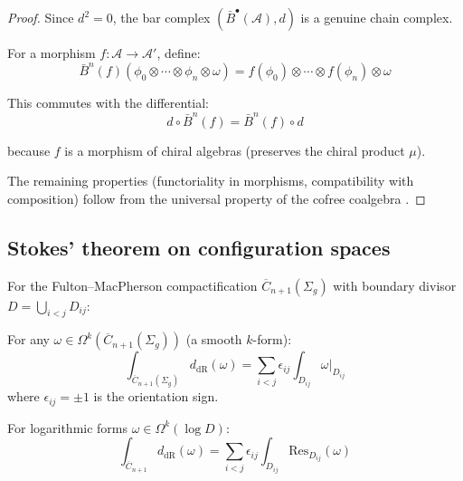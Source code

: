 \begin{proof}
Since $d^2 = 0$, the bar complex $(\bar{B}^{\bullet}(\mathcal{A}), d)$ is a genuine chain complex.

For a morphism $f: \mathcal{A} \to \mathcal{A}'$, define:
\[\bar{B}^n(f)(\phi_0 \otimes \cdots \otimes \phi_n \otimes \omega) = f(\phi_0) \otimes \cdots \otimes f(\phi_n) \otimes \omega\]

This commutes with the differential:
\[d \circ \bar{B}^n(f) = \bar{B}^n(f) \circ d\]

because $f$ is a morphism of chiral algebras (preserves the chiral product $\mu$).

The remaining properties (functoriality in morphisms, compatibility with composition) follow from the universal property of the cofree coalgebra \cite[Section~1.2]{LV12}.
\end{proof}

\subsection{Stokes' theorem on configuration spaces}

\begin{theorem}\label{thm:stokes-config}
For the Fulton--MacPherson compactification $\overline{C}_{n+1}(\Sigma_g)$ with boundary divisor $D = \bigcup_{i<j} D_{ij}$:

For any $\omega \in \Omega^k(\overline{C}_{n+1}(\Sigma_g))$ (a smooth $k$-form):
\[\int_{\overline{C}_{n+1}(\Sigma_g)} d_{\text{dR}}(\omega) = \sum_{i<j} \epsilon_{ij} \int_{D_{ij}} \omega|_{D_{ij}}\]
where $\epsilon_{ij} = \pm 1$ is the orientation sign.

For logarithmic forms $\omega \in \Omega^k(\log D)$:
\[\int_{\overline{C}_{n+1}} d_{\text{dR}}(\omega) = \sum_{i<j} \epsilon_{ij} \int_{D_{ij}} \text{Res}_{D_{ij}}(\omega)\]
\end{theorem}

